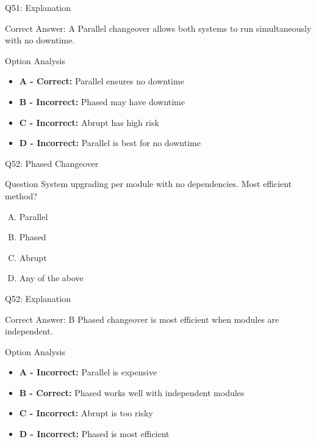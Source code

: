 \documentclass{beamer}
\begin{document}
	\begin{frame}{Q51: Explanation}
		\begin{block}{Correct Answer: A}
			Parallel changeover allows both systems to run simultaneously with no downtime.
		\end{block}
		\begin{block}{Option Analysis}
			\begin{itemize}
				\item \textbf{A - Correct:} Parallel ensures no downtime
				\item \textbf{B - Incorrect:} Phased may have downtime
				\item \textbf{C - Incorrect:} Abrupt has high risk
				\item \textbf{D - Incorrect:} Parallel is best for no downtime
			\end{itemize}
		\end{block}
	\end{frame}
	
	\begin{frame}{Q52: Phased Changeover}
		\begin{block}{Question}
			System upgrading per module with no dependencies. Most efficient method?
		\end{block}
		\begin{enumerate}[(A)]
			\item Parallel
			\item Phased
			\item Abrupt
			\item Any of the above
		\end{enumerate}
	\end{frame}
	
	\begin{frame}{Q52: Explanation}
		\begin{block}{Correct Answer: B}
			Phased changeover is most efficient when modules are independent.
		\end{block}
		\begin{block}{Option Analysis}
			\begin{itemize}
				\item \textbf{A - Incorrect:} Parallel is expensive
				\item \textbf{B - Correct:} Phased works well with independent modules
				\item \textbf{C - Incorrect:} Abrupt is too risky
				\item \textbf{D - Incorrect:} Phased is most efficient
			\end{itemize}
		\end{block}
	\end{frame}
	
\end{document}
